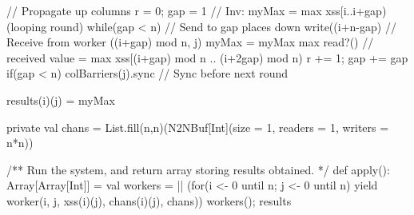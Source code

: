 \begin{answer}
\begin{enumerate}
\begin{scala}
{{      // Propagate up columns
      r = 0; gap = 1
      // Inv: myMax = max xss[i..i+gap) (looping round)
      while(gap < n){
        // Send to gap places down
        write((i+n-gap)%
        // Receive from worker ((i+gap) mod n, j)
        myMax = myMax max read?() 
        // received value = max xss[(i+gap) mod n .. (i+2gap) mod n)
        r += 1; gap += gap
        if(gap < n) colBarriers(j).sync // Sync before next round
      }

      results(i)(j) = myMax
  }

  private val chans =
    List.fill(n,n)(N2NBuf[Int](size = 1, readers = 1, writers = n*n))

  /** Run the system, and return array storing results obtained. */
  def apply(): Array[Array[Int]] = {
    val workers = 
      || (for(i <- 0 until n; j <- 0 until n) yield
            worker(i, j, xss(i)(j), chans(i)(j), chans))
    workers(); results
  }
}
\end{scala}








\end{enumerate}
\end{answer}
